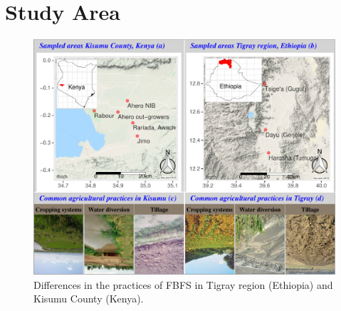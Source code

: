 \documentclass[11pt,preprint]{article}
\begin{document}
\hypertarget{study-area}{%
\section{Study Area}\label{study-area}}

\begin{figure}[!htbp]
    \centering
    \includegraphics{figures/Modelling_FBFS_study_area}
    \caption{Differences in the practices of FBFS in Tigray region (Ethiopia) and Kisumu County                (Kenya).
    \label{Figure_1}}
\end{figure}
\end{document}
